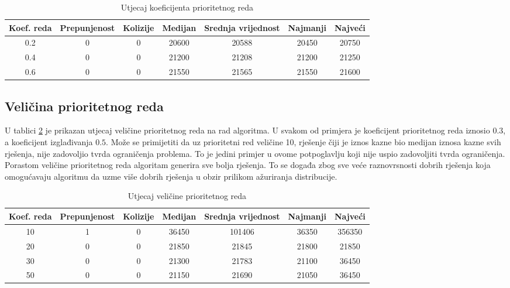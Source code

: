\documentclass[times, utf8, zavrsni]{fer}
\begin{document}
\begin{table}
  \caption{Utjecaj koeficijenta prioritetnog reda}
  \label{tbl:utjecaj_reda}
  \centering
  \begin{tabular}{c | c | c | c | c | c | c  }
    Koef. reda &  Prepunjenost & Kolizije & Medijan & Srednja vrijednost & Najmanji & Najveći \\ \hline
    0.2 & 0 & 0 & 20600 & 20588 & 20450 & 20750 \\ \hline
    0.4 & 0 & 0 & 21200 & 21208 & 21200 & 21250 \\ \hline
    0.6 & 0 & 0 & 21550 & 21565 & 21550 & 21600
  \end{tabular}
\end{table}


\subsection{Veličina prioritetnog reda}
U tablici \ref{tbl:utjecaj_vel_reda} je prikazan utjecaj veličine prioritetnog reda na rad algoritma. U svakom od primjera je koeficijent prioritetnog reda iznosio $0.3$, a
koeficijent izglađivanja $0.5$. Može se primijetiti da uz prioritetni red veličine 10, rješenje čiji je iznos kazne bio medijan iznosa kazne svih rješenja, nije zadovoljio
tvrda ograničenja problema. To je jedini primjer u ovome potpoglavlju koji nije uspio zadovoljiti tvrda ograničenja. Porastom veličine prioritetnog reda algoritam generira sve
bolja rješenja. To se događa zbog sve veće raznovrsnosti dobrih rješenja koja omogućavaju algoritmu da uzme više dobrih rješenja u obzir prilikom ažuriranja distribucije.


\begin{table}
  \caption{Utjecaj veličine prioritetnog reda}
  \label{tbl:utjecaj_vel_reda}
  \centering
  \begin{tabular}{c | c | c | c | c | c | c  }
    Koef. reda &  Prepunjenost & Kolizije & Medijan & Srednja vrijednost & Najmanji & Najveći \\ \hline
    10 & 1 & 0 & 36450 & 101406 & 36350 & 356350 \\ \hline
    20 & 0 & 0 & 21850 & 21845 & 21800 & 21850 \\ \hline
    30 & 0 & 0 & 21300 & 21783 & 21100 & 36450 \\ \hline
    50 & 0 & 0 & 21150 & 21690 & 21050 & 36450
  \end{tabular}
\end{table}
\end{document}
